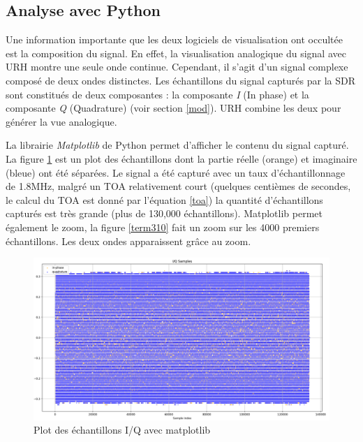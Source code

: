 \subsection{Analyse avec Python}

Une information importante que les deux logiciels de visualisation ont occultée est la composition du signal. En effet, la visualisation analogique du signal avec \ac{URH} montre une seule onde continue. Cependant, il s'agit d'un signal complexe composé de deux ondes distinctes. Les échantillons du signal capturés par la \ac{SDR} sont constitués de deux composantes : la composante \textit{I} (In phase) et la composante \textit{Q} (Quadrature) (voir section \ref{mod}). \ac{URH} combine les deux pour générer la vue analogique.

\vspace{0.1cm}

La librairie \textit{Matplotlib} de Python permet d'afficher le contenu du signal capturé. La figure  \ref{term309} est un plot des échantillons dont la partie réelle (orange) et imaginaire (bleue) ont été séparées. Le signal a été capturé avec un taux d'échantil\-lonnage de 1.8MHz, malgré un \ac{TOA} relativement court (quelques centièmes de secondes, le calcul du \ac{TOA} est donné par l'équation \ref{toa}) la quantité d'échantillons capturés est très grande (plus de 130,000 échantillons). Matplotlib permet également le zoom, la figure \ref{term310} fait un zoom sur les 4000 premiers échantillons. Les deux ondes apparaissent grâce au zoom.

\begin{figure}[h]
\centering

\includegraphics[scale=0.13]{images/iq1.png}
\caption{Plot des échantillons I/Q avec matplotlib}\label{term309}
\end{figure}



